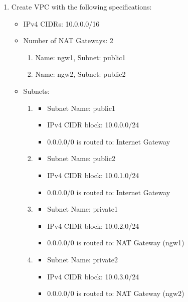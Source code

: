 \documentclass{article}
\begin{document}
\begin{enumerate}
  \item Create VPC with the following specifications:
  \begin{itemize}
    \item IPv4 CIDRs: 10.0.0.0/16
    \item Number of NAT Gateways: 2 
    \begin{enumerate}
      \item Name: ngw1, Subnet: public1
      \item Name: ngw2, Subnet: public2
    \end{enumerate}
    \item Subnets:
    \begin{enumerate}
      \item 
      \begin{itemize}
        \item Subnet Name: public1
        \item IPv4 CIDR block: 10.0.0.0/24
        \item 0.0.0.0/0 is routed to: Internet Gateway
      \end{itemize}
      \vspace{5mm} 
      \item 
      \begin{itemize}
        \item Subnet Name: public2
        \item IPv4 CIDR block: 10.0.1.0/24
        \item 0.0.0.0/0 is routed to: Internet Gateway
      \end{itemize}
      \vspace{5mm} 
      \item 
      \begin{itemize}
        \item Subnet Name: private1
        \item IPv4 CIDR block: 10.0.2.0/24
        \item 0.0.0.0/0 is routed to: NAT Gateway (ngw1) 
      \end{itemize}
      \vspace{5mm} 
      \item 
      \begin{itemize}
        \item Subnet Name: private2
        \item IPv4 CIDR block: 10.0.3.0/24
        \item 0.0.0.0/0 is routed to: NAT Gateway (ngw2) 

\end{itemize}
\end{enumerate}
\end{itemize}
\end{enumerate}
\end{document}
